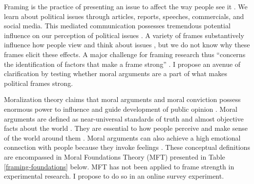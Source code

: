 \documentclass[11pt]{article}
\begin{document}
Framing is the practice of presenting an issue to affect the way people see it \citep{aaroe_investigating_2011,druckman_evaluating_2001}. We learn about political issues through articles, reports, speeches, commercials, and social media. This mediated communication possesses tremendous potential influence on our perception of political issues \citep{iyengar_framing_1996,kam_risk_2010}. A variety of frames substantively influence how people view and think about issues \citep{entman_projections_2004,slothuus_political_2010,sniderman_structure_2004}, but we do not know why these frames elicit these effects. A major challenge for framing research thus ``concerns the identification of factors that make a frame strong'' \citep[p. 116]{chong_framing_2007}. I propose an avenue of clarification by testing whether moral arguments are a part of what makes political frames strong. 

Moralization theory claims that moral arguments and moral conviction possess enormous power to influence and guide development of public opinion \citep{haidt_moral_2003,haidt_2012_righteous,converse_nature_1964,zaller_nature_1992}. Moral arguments are defined as near-universal standards of truth and almost objective facts about the world \citep{skitka_psychology_2010}. They are essential to how people perceive and make sense of the world around them \citep{frank_whats_2005,mooney_public_2001}. Moral arguments can also achieve a high emotional connection with people because they invoke feelings \citep{skitka_moral_2005,tatalovich_moral_2011}. These conceptual definitions are encompassed in Moral Foundations Theory (MFT) presented in Table \ref{framing-foundations} below. MFT has not been applied to frame strength in experimental research. I propose to do so in an online survey experiment.


\begin{table}[H]
\singlespacing
\centering
{}
\caption{Foundations of Moral Arguments}
\label{framing-foundations}
\end{table} 
\end{document}
